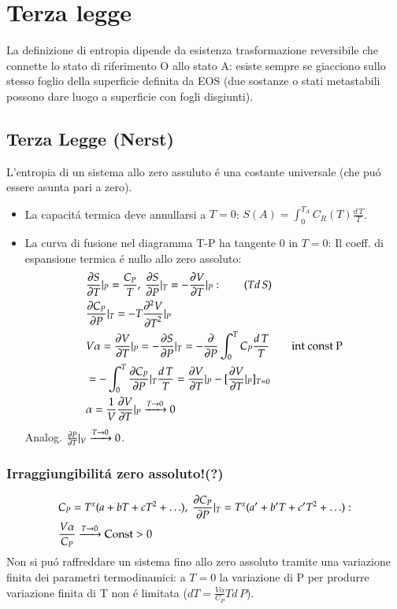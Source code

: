     \chapter{Terza legge}
        La definizione di entropia dipende da esistenza trasformazione reversibile che connette lo stato di riferimento O allo stato A: esiste sempre se giacciono sullo stesso foglio della superficie definita da EOS (due sostanze o stati metastabili possono dare luogo a superficie con fogli disgiunti).
        \section{Terza Legge (Nerst)}
            L'entropia di un sistema allo zero assuluto \'e una costante universale (che pu\'o essere asunta pari a zero).
            \begin{itemize}
                \item La capacit\'a termica deve annullarsi a $T=0$: $S(A)=\int_0^{T_A}C_R(T)\frac{d\,T}{T}$.
                \item La curva di fusione nel diagramma T-P ha tangente 0 in $T=0$:
                    Il coeff. di espansione termica \'e nullo allo zero assoluto:
                    \begin{align*}
                        &\PDy{T}{S}|_P=\frac{C_P}{T},\ \PDy{P}{S}|_T=-\PDy{T}{V}|_P:\tag{$Td\,S$}\\
                        &\PDy{P}{C_P}|_T=-T\PtwoDy{T}{V}|_P\\
                        &V\alpha=\PDy{T}{V}|_P=-\PDy{P}{S}|_T=-\PDof{P}\int_0^TC_P \frac{d\,T}{T}\tag*{int const P}\\
                        &=-\int_0^T\PDy{P}{C_P}|_T \frac{d\,T}{T}=\PDy{T}{V}|_P-[\PDy{T}{V}|_P]_{T=0}\\
                        &\alpha=\frac{1}{V}\PDy{T}{V}|_P\xrightarrow{T\to0}0
                    \end{align*}
                    Analog. $\PDy{T}{P}|_V\xrightarrow{T\to0}0$.
            \end{itemize}
            \subsection{Irraggiungibilit\'a zero assoluto!(?)}
            \begin{align*}
                &C_P=T^x(a+bT+cT^2+\ldots),\ \PDy{P}{C_P}|_T=T^x(a'+b'T+c'T^2+\ldots):\\
                &\frac{V\alpha}{C_P}\xrightarrow{T\to0}\const>0
            \end{align*}
            Non si pu\'o raffreddare un sistema fino allo zero assoluto tramite una variazione finita dei parametri termodinamici: a $T=0$ la variazione di P per produrre variazione finita di T non \'e limitata ($dT=\frac{V\alpha}{C_P}Td\,P$).
